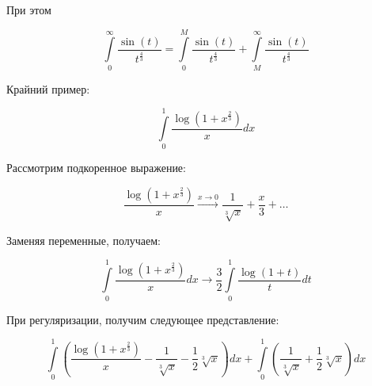 \documentclass[10pt,a4paper]{article}
\begin{document}
	При этом 
	
	\begin{equation}
		\int\limits_{0}^{\infty}\frac{\sin\left(t\right)}{t^{\frac{4}{3}}} = 
		\int\limits_{0}^{M}\frac{\sin\left(t\right)}{t^{\frac{4}{3}}} + 
		\int\limits_{M}^{\infty}\frac{\sin\left(t\right)}{t^{\frac{4}{3}}}
	\end{equation}
	
	Крайний пример:
	
	\begin{equation}
		\int\limits_{0}^{1}\frac{\log\left(1 + x^{\frac{2}{3}}\right)}{x}dx
	\end{equation}
	
	Рассмотрим подкоренное выражение:
	
	\begin{equation}
		\frac{\log\left(1 + x^{\frac{2}{3}}\right)}{x} \xrightarrow{x \to 0}
		\frac{1}{\sqrt[3]{x}} + \frac{x}{3} + \ldots 
	\end{equation}
	
	Заменяя переменные, получаем:
	
	\begin{equation}
		\int\limits_{0}^{1}\frac{\log\left(1 + x^{\frac{2}{3}}\right)}{x}dx \to
		\frac{3}{2}\int\limits_{0}^{1}\frac{\log\left(1 + t\right)}{t}dt
	\end{equation}
	
	При регуляризации, получим следующее представление:
	
	\begin{equation}
		\int\limits_{0}^{1}\left(\frac{\log\left(1 + x^{\frac{2}{3}}\right)}{x}
		 - \frac{1}{\sqrt[3]{x}} - \frac{1}{2}\sqrt[3]{x}\right)dx + 
		 \int\limits_{0}^{1}\left(\frac{1}{\sqrt[3]{x}} + 
		 \frac{1}{2}\sqrt[3]{x}\right)dx
	\end{equation}
	
\end{document}
